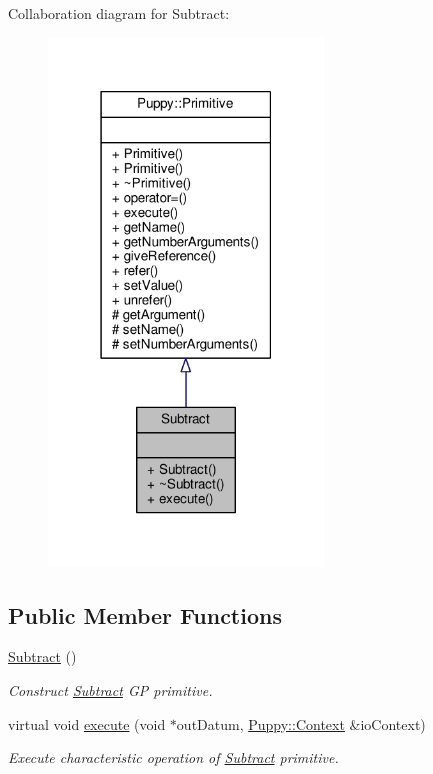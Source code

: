 Collaboration diagram for Subtract\+:
\nopagebreak
\begin{figure}[H]
\begin{center}
\leavevmode
\includegraphics[width=207pt]{classSubtract__coll__graph}
\end{center}
\end{figure}
\subsection*{Public Member Functions}
\begin{DoxyCompactItemize}
\item 
\hypertarget{classSubtract_a00e1bfb4f3eb6f166abef10490ccba3b}{}\hyperlink{classSubtract_a00e1bfb4f3eb6f166abef10490ccba3b}{Subtract} ()\label{classSubtract_a00e1bfb4f3eb6f166abef10490ccba3b}

\begin{DoxyCompactList}\small\item\em Construct \hyperlink{classSubtract}{Subtract} G\+P primitive. \end{DoxyCompactList}\item 
virtual void \hyperlink{classSubtract_a7b85b95cd90fe9633ba684802343d2e2}{execute} (void $\ast$out\+Datum, \hyperlink{classPuppy_1_1Context}{Puppy\+::\+Context} \&io\+Context)
\begin{DoxyCompactList}\small\item\em Execute characteristic operation of \hyperlink{classSubtract}{Subtract} primitive. \end{DoxyCompactList}\end{DoxyCompactItemize}
